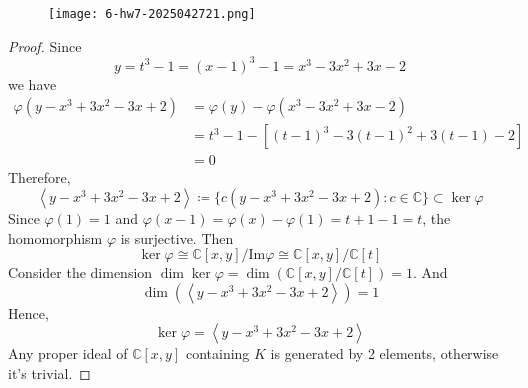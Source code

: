 \begin{exercise}
\begin{figure}[H]
\centering
\texttt{[image: 6-hw7-2025042721.png]}
\label{}
\end{figure}
\end{exercise}
\begin{proof}
Since
\[
y=t^{3}-1=(x-1)^{3}-1=x^3-3x^2+3x-2
\]
we have
\[
\begin{aligned}
\varphi(y-x^3+3x^2-3x+2) & =\varphi(y)-\varphi(x^3-3x^2+3x-2) \\
 & =t^3-1-[(t-1)^3-3(t-1)^2+3(t-1)-2] \\
 & =0
\end{aligned}
\]
Therefore,
\[
\left< y-x^3+3x^2-3x+2 \right>\coloneqq \{ c(y-x^3+3x^2-3x+2):c\in \mathbb{C} \}\subset \ker \varphi
\]
Since $\varphi(1)=1$ and $\varphi(x-1)=\varphi(x)-\varphi(1)=t+1-1=t$, the homomorphism $\varphi$ is surjective. Then
\[
\ker \varphi \cong \mathbb{C}[x,y]/\mathrm{Im}\varphi \cong \mathbb{C}[x,y]/\mathbb{C}[t]
\]
Consider the dimension $\dim \ker \varphi=\dim(\mathbb{C}[x,y]/\mathbb{C}[t])=1$. And
\[
\dim (\left< y-x^3+3x^2-3x+2 \right> )=1
\]
Hence,
\[
\ker \varphi=\left< y-x^3+3x^2-3x+2 \right> 
\]
Any proper ideal of $\mathbb{C}[x,y]$ containing $K$ is generated by 2 elements, otherwise it's trivial.
\end{proof}

